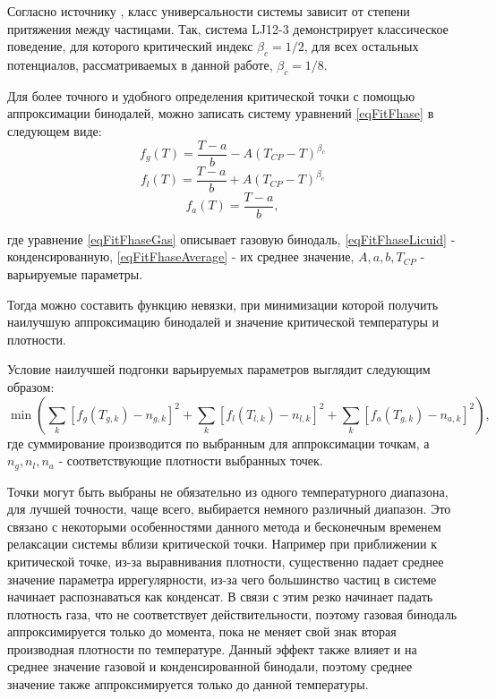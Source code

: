 Согласно источнику \cite{classCrit}, класс универсальности системы зависит от степени притяжения между частицами. Так, система LJ12-3 демонстрирует классическое поведение, для которого критический индекс $\beta_c = 1/2$, для всех остальных потенциалов, рассматриваемых в данной работе, $\beta_c = 1/8$.

Для более точного и удобного определения критической точки с помощью аппроксимации бинодалей, можно записать систему уравнений \ref{eqFitFhase} в следующем виде:
\begin{equation}
f_g(T) = \frac{T-a}{b} - A(T_{CP} - T)^{\beta_c}
\label{eqFitFhaseGas}
\end{equation}
\begin{equation}
f_l(T) = \frac{T-a}{b} + A(T_{CP} - T)^{\beta_c}
\label{eqFitFhaseLicuid}
\end{equation}
\begin{equation}
f_a(T) = \frac{T-a}{b},
\label{eqFitFhaseAverage}
\end{equation}

где уравнение \ref{eqFitFhaseGas} описывает газовую бинодаль, \ref{eqFitFhaseLicuid} - конденсированную, \ref{eqFitFhaseAverage} - их среднее значение, $A, a, b, T_{CP}$ - варьируемые параметры. 

Тогда можно составить функцию невязки, при минимизации которой получить наилучшую аппроксимацию бинодалей и значение критической температуры и плотности.

Условие наилучшей подгонки варьируемых параметров выглядит следующим образом:
\begin{equation}
\min \left(\sum\limits_{k} \left[ f_g(T_{g, k}) - n_{g, k}  \right]^2 + \sum\limits_{k} \left[ f_l(T_{l, k}) - n_{l, k}  \right]^2 + \sum\limits_{k} \left[ f_a(T_{g, k}) - n_{a, k}  \right]^2 \right),
\label{eqFitResidual}
\end{equation}
где суммирование производится по выбранным для аппроксимации точкам, а $n_g, n_l, n_a$ - соответствующие плотности выбранных точек. 

Точки могут быть выбраны не обязательно из одного температурного диапазона, для лучшей точности, чаще всего, выбирается немного различный диапазон. Это связано с некоторыми особенностями данного метода и бесконечным временем релаксации системы вблизи критической точки. Например при приближении к критической точке, из-за выравнивания плотности, существенно падает среднее значение параметра иррегулярности, из-за чего большинство частиц в системе начинает распознаваться как конденсат. В связи с этим резко начинает падать плотность газа, что не соответствует действительности, поэтому газовая бинодаль аппроксимируется только до момента, пока не меняет свой знак вторая производная плотности по температуре. Данный эффект также влияет и на среднее значение газовой и конденсированной бинодали, поэтому среднее значение также аппроксимируется только до данной температуры.


